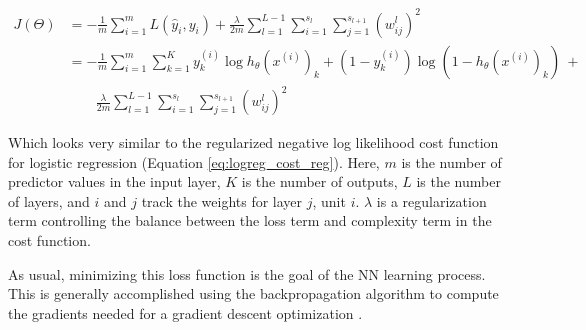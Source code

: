 \begin{equation}
\label{eq:nn_cost_function}
    \begin{aligned}
        J(\Theta) &= 
        -\frac{1}{m}\sum_{i=1}^{m}{
        L(\hat{y}_i, y_i)} + \frac{\lambda}{2m}
        \sum_{l=1}^{L-1}{
        \sum_{i=1}^{s_l}{
        \sum_{j=1}^{s_{l+1}}{(w_{ij}^{l})^2}}} \\
        &= -\frac{1}{m}
        \sum_{i=1}^{m}{
        \sum_{k=1}^{K}{
        y_k^{(i)}\log{h_{\theta}(x^{(i)})_k}+
        (1-y_k^{(i)})\log{(1-h_{\theta}(x^{(i)})_k)}}}\ + \\
        &\qquad \frac{\lambda}{2m}
        \sum_{l=1}^{L-1}{
        \sum_{i=1}^{s_l}{
        \sum_{j=1}^{s_{l+1}}{(w_{ij}^{l})^2}}}
    \end{aligned}
\end{equation}

Which looks very similar to the regularized negative log likelihood cost function for logistic regression (Equation \ref{eq:logreg_cost_reg}). Here, $m$ is the number of predictor values in the input layer, $K$ is the number of outputs, $L$ is the number of layers, and $i$ and $j$ track the weights for layer $j$, unit $i$. $\lambda$ is a regularization term controlling the balance between the loss term and complexity term in the cost function. 

As usual, minimizing this loss function is the goal of the NN learning process. This is generally accomplished using the backpropagation algorithm to compute the gradients needed for a gradient descent optimization \citep[p.\ 396]{hastie_elements_2009}.

